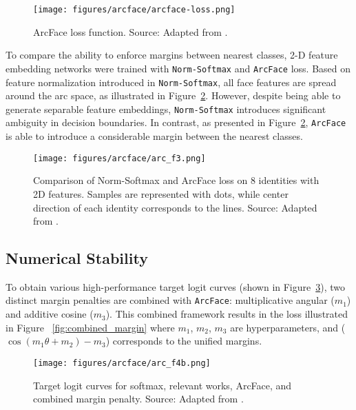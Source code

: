 \documentclass[10pt,a4paper,twoside]{article}
\begin{document}
\begin{figure}[h]
    \centering
    \texttt{[image: figures/arcface/arcface-loss.png]} 
    \caption{ArcFace loss function. Source: Adapted from \cite{arcface}.}
    \label{fig:ArcFaceLoss}
\end{figure}

To compare the ability to enforce margins between nearest classes, 2-D feature embedding networks were trained with \texttt{Norm-Softmax} and \texttt{ArcFace} loss. Based on feature normalization introduced in \texttt{Norm-Softmax}, all face features are spread around the arc space, as illustrated in Figure~\ref{fig:arc_f3}. However, despite being able to generate separable feature embeddings, \texttt{Norm-Softmax} introduces significant ambiguity in decision boundaries. In contrast, as presented in Figure~\ref{fig:arc_f3}, \texttt{ArcFace} is able to introduce a considerable margin between the nearest classes.

\begin{figure}[h]
    \centering
    \texttt{[image: figures/arcface/arc\_f3.png]} 
    \caption{Comparison of Norm-Softmax and ArcFace loss on 8 identities with 2D features. Samples are represented with dots, while center direction of each identity corresponds to the lines. Source: Adapted from \cite{arcface}.}
    \label{fig:arc_f3}
\end{figure}

\subsection{Numerical Stability}

To obtain various high-performance target logit curves (shown in Figure~\ref{fig:arc_f4b}), two distinct margin penalties are combined with \texttt{ArcFace}: multiplicative angular ($m_1$)\cite{liu2017sphereface, liu2016large} and additive cosine ($m_3$)\cite{wang2018cosface, wang2018additive}. This combined framework results in the loss illustrated in Figure ~\ref{fig:combined_margin} where $m_1$, $m_2$, $m_3$ are hyperparameters, and ($\cos(m_1\theta + m_2) - m_3$) corresponds to the unified margins.


\begin{figure}[h]
    \centering
    \texttt{[image: figures/arcface/arc\_f4b.png]} 
    \caption{Target logit curves for softmax, relevant works, ArcFace, and combined margin penalty. Source: Adapted from \cite{arcface}.}
    \label{fig:arc_f4b}
\end{figure}
\end{document}
